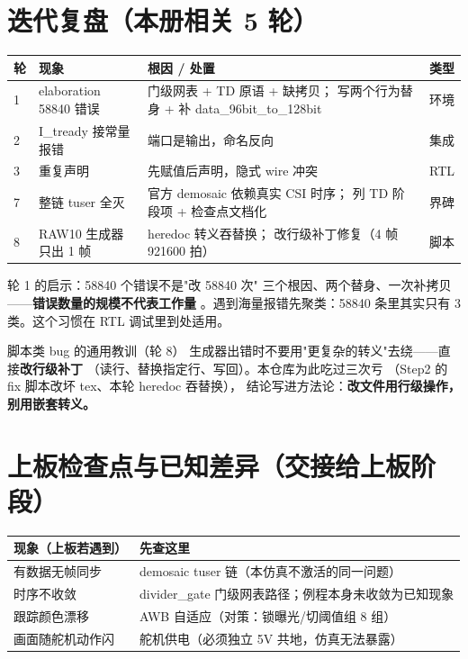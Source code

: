 \section{迭代复盘（本册相关 5 轮）}

\begin{center}
\begin{tabular}{llp{5.0cm}l}
\toprule
\rowcolor{rowtint}\textbf{轮} & \textbf{现象} & \textbf{根因 / 处置} & \textbf{类型} \\
\midrule
1 & elaboration 58840 错误 & 门级网表 + TD 原语 + 缺拷贝；
  写两个行为替身 + 补 data\_96bit\_to\_128bit & 环境 \\
2 & I\_tready 接常量报错 & 端口是输出，命名反向 & 集成 \\
3 & 重复声明 & 先赋值后声明，隐式 wire 冲突 & RTL \\
7 & 整链 tuser 全灭 & 官方 demosaic 依赖真实 CSI 时序；
  列 TD 阶段项 + 检查点文档化 & 界碑 \\
8 & RAW10 生成器只出 1 帧 & heredoc 转义吞替换；
  改行级补丁修复（4 帧 921600 拍） & 脚本 \\
\bottomrule
\end{tabular}
\end{center}

\begin{warnbox}{轮 1 的启示：58840 个错误不是"改 58840 次"}
三个根因、两个替身、一次补拷贝——\textbf{错误数量的规模不代表工作量}
。遇到海量报错先聚类：58840 条里其实只有 3 类。这个习惯在
RTL 调试里到处适用。
\end{warnbox}

\begin{tipbox}{脚本类 bug 的通用教训（轮 8）}
生成器出错时不要用"更复杂的转义"去绕——直接\textbf{改行级补丁}
（读行、替换指定行、写回）。本仓库为此吃过三次亏
（Step2 的 fix 脚本改坏 tex、本轮 heredoc 吞替换），
结论写进方法论：\textbf{改文件用行级操作，别用嵌套转义。}
\end{tipbox}

\section{上板检查点与已知差异（交接给上板阶段）}

\begin{center}
\begin{tabular}{ll}
\toprule
\rowcolor{rowtint}\textbf{现象（上板若遇到）} & \textbf{先查这里} \\
\midrule
有数据无帧同步 & demosaic tuser 链（本仿真不激活的同一问题） \\
时序不收敛 & divider\_gate 门级网表路径；例程本身未收敛为已知现象 \\
跟踪颜色漂移 & AWB 自适应（对策：锁曝光/切阈值组 8 组） \\
画面随舵机动作闪 & 舵机供电（必须独立 5V 共地，仿真无法暴露） \\
\bottomrule
\end{tabular}
\end{center}


